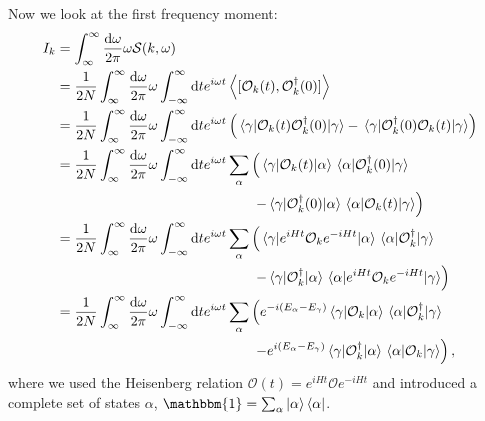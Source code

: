 \documentclass[11pt, a4paper]{report} %
\begin{document}
Now we look at the first frequency moment:
\begin{align}
  I_k &= \int_{\infty}^{\infty}\frac{\dd \omega}{2\pi} \omega \mathcal{S}(k,\omega)\\
  &= \frac{1}{2N} \int_{\infty}^{\infty}\frac{\dd \omega}{2\pi} \omega \int_{-\infty}^{\infty} \dd t e^{i\omega t} \expval{[\mathcal{O}_k(t),\mathcal{O}_{k}^{\dagger}(0)]}\\
&= \frac{1}{2N} \int_{\infty}^{\infty}\frac{\dd \omega}{2\pi} \omega \int_{-\infty}^{\infty} \dd t e^{i\omega t} \left(\matrixel{\gamma}{\mathcal{O}_k(t)\mathcal{O}_{k}^{\dagger}(0)}{\gamma} - \matrixel{\gamma}{\mathcal{O}_{k}^{\dagger}(0)\mathcal{O}_k(t)}{\gamma}\right) \\
&= \frac{1}{2N} \int_{\infty}^{\infty}\frac{\dd \omega}{2\pi} \omega \int_{-\infty}^{\infty} \dd t e^{i\omega t} \sum_{\alpha} \left(\matrixel{\gamma}{\mathcal{O}_k(t)}{\alpha}\matrixel{\alpha}{\mathcal{O}_{k}^{\dagger}(0)}{\gamma} \right.\nonumber\\
&\qquad\qquad\qquad\qquad\qquad\qquad\qquad\left.- \matrixel{\gamma}{\mathcal{O}_{k}^{\dagger}(0)}{\alpha}\matrixel{\alpha}{\mathcal{O}_k(t)}{\gamma}\right)\\
&= \frac{1}{2N} \int_{\infty}^{\infty}\frac{\dd \omega}{2\pi} \omega \int_{-\infty}^{\infty} \dd t e^{i\omega t} \sum_{\alpha} \left(\matrixel{\gamma}{e^{iHt}\mathcal{O}_ke^{-iHt}}{\alpha}\matrixel{\alpha}{\mathcal{O}_{k}^{\dagger}}{\gamma} \right.\nonumber\\
&\qquad\qquad\qquad\qquad\qquad\qquad\qquad\left.- \matrixel{\gamma}{\mathcal{O}_{k}^{\dagger}}{\alpha}\matrixel{\alpha}{e^{iHt}\mathcal{O}_ke^{-iHt}}{\gamma}\right)\\
&= \frac{1}{2N} \int_{\infty}^{\infty}\frac{\dd \omega}{2\pi} \omega \int_{-\infty}^{\infty} \dd t e^{i\omega t} \sum_{\alpha} \left(e^{-i(E_{\alpha}-E_{\gamma})}\matrixel{\gamma}{\mathcal{O}_k}{\alpha}\matrixel{\alpha}{\mathcal{O}_{k}^{\dagger}}{\gamma} \right.\nonumber\\ 
&\qquad\qquad\qquad\qquad\qquad\qquad\qquad\left.- e^{i(E_{\alpha}-E_{\gamma})}\matrixel{\gamma}{\mathcal{O}_{k}^{\dagger}}{\alpha}\matrixel{\alpha}{\mathcal{O}_k}{\gamma}\right), \label{eq:fourierfreqmoment}
\end{align}
where we used the Heisenberg relation \(\mathcal{O}(t) = e^{iHt}\mathcal{O}e^{-iHt}\) and introduced a complete set of states \(\alpha\), \(\mathbbm{1}=\sum_{\alpha}\ket{\alpha}\bra{\alpha}\).
\end{document}
